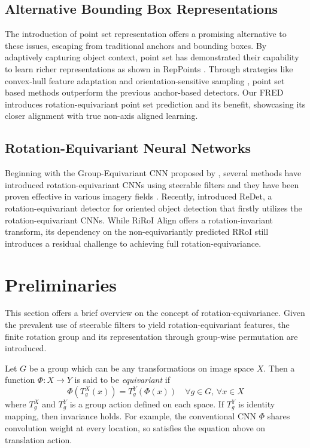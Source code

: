 \documentclass[letterpaper]{article} %
\begin{document}
\subsection{Alternative Bounding Box Representations}
The introduction of point set representation offers a promising alternative to these issues, escaping from traditional anchors and bounding boxes. By adaptively capturing object context, point set has demonstrated their capability to learn richer representations as shown in RepPoints \citep{yang2019reppoints}. Through strategies like convex-hull feature adaptation \citep{guo2021beyond} and orientation-sensitive sampling \citep{li2022oriented}, point set based methods outperform the previous anchor-based detectors. Our FRED introduces rotation-equivariant point set prediction and its benefit, showcasing its closer alignment with true non-axis aligned learning.



\subsection{Rotation-Equivariant Neural Networks}
Beginning with the Group-Equivariant CNN proposed by \citet{cohen2016group}, several methods have introduced rotation-equivariant CNNs using steerable filters \citep{weiler2019general, cesa2021program} and they have been proven effective in various imagery fields \citep{veeling2018rotation, gupta2021rotation, lee2023learning}. Recently, \citet{han2021ReDet} introduced ReDet, a rotation-equivariant detector for oriented object detection that firstly utilizes the rotation-equivariant CNNs. While RiRoI Align offers a rotation-invariant transform, its dependency on the non-equivariantly predicted RRoI still introduces a residual challenge to achieving full rotation-equivariance.

\section{Preliminaries}
This section offers a brief overview on the concept of rotation-equivariance. Given the prevalent use of steerable filters to yield rotation-equivariant features, the finite rotation group and its representation through group-wise permutation are introduced.

Let \( G \) be a group which can be any transformations on image space \( X \). Then a function \( \Phi: X \to Y \) is said to be \textit{equivariant} if
\begin{equation}
     \Phi\left(T^X_g(x)\right) = T^Y_g\left(\Phi(x)\right)  \quad \forall g \in G ,\, \forall x \in X
\end{equation}
where \(T^X_g\) and \(T^Y_g\) is a group action defined on each space. If  \(T^Y_g\) is identity mapping, then invariance holds. For example, the conventional CNN \(\Phi\) shares convolution weight at every location, so satisfies the equation above on translation action.
\end{document}
